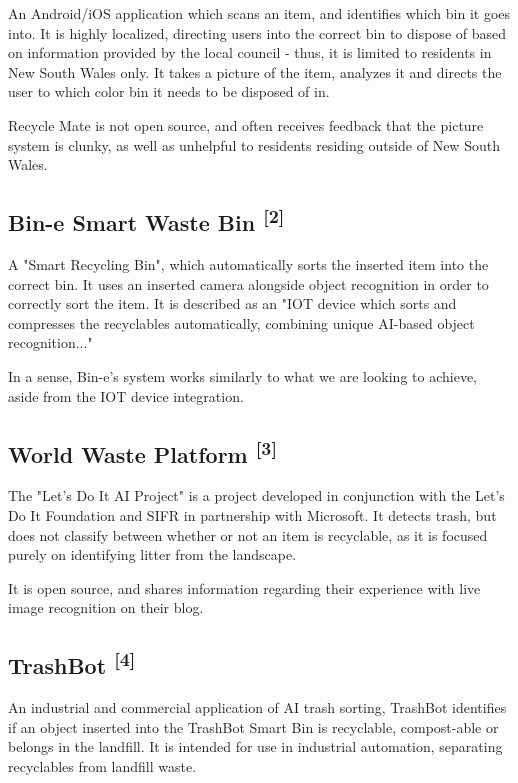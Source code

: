 \documentclass[conference]{IEEEtran}
\begin{document}
An Android/iOS application which scans an item, and identifies which bin it goes into. It is highly localized, directing users into the correct bin to dispose of based on information provided by the local council - thus, it is limited to residents in New South Wales only. It takes a picture of the item, analyzes it and directs the user to which color bin it needs to be disposed of in.

Recycle Mate is not open source, and often receives feedback that the picture system is clunky, as well as unhelpful to residents residing outside of New South Wales.
\newline

\subsection{Bin-e Smart Waste Bin \textsuperscript{[2]}}

A "Smart Recycling Bin", which automatically sorts the inserted item into the correct bin. It uses an inserted camera alongside object recognition in order to correctly sort the item. It is described as an "IOT device which sorts and compresses the recyclables automatically, combining unique AI-based object recognition..."

In a sense, Bin-e's system works similarly to what we are looking to achieve, aside from the IOT device integration.
\newline

\subsection{World Waste Platform \textsuperscript{[3]}}

The "Let's Do It AI Project" is a project developed in conjunction with the Let's Do It Foundation and SIFR in partnership with Microsoft. It detects trash, but does not classify between whether or not an item is recyclable, as it is focused purely on identifying litter from the landscape. 

It is open source, and shares information regarding their experience with live image recognition on their blog.
\newline

\subsection{TrashBot \textsuperscript{[4]}}

An industrial and commercial application of AI trash sorting, TrashBot identifies if an object inserted into the TrashBot Smart Bin is recyclable, compost-able or belongs in the landfill. It is intended for use in industrial automation, separating recyclables from landfill waste. 
\newline
\end{document}
